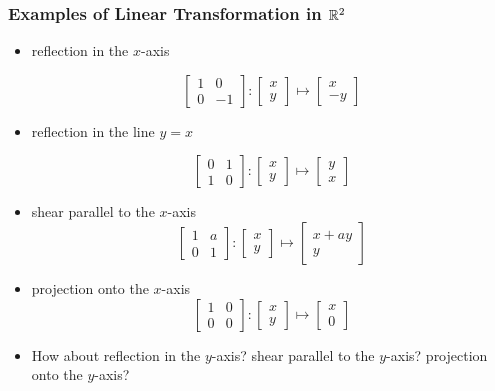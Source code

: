 \documentclass{beamer}
\begin{document}
\begin{frame}[fragile]
  \frametitle{Examples of Linear Transformation in $\mathbb{R}^2$}


\begin{itemize}
\item reflection in the $x$-axis

\[
\left[
\begin{array}{cc}
1 & 0 \\
0 & -1  
\end{array}
\right]:
\left[
\begin{array}{c}
x \\ y 
\end{array}
\right]
\mapsto
\left[
\begin{array}{c}
x \\ -y 
\end{array}
\right]
\]

\item reflection in the line $y = x$

\[
\left[
\begin{array}{cc}
0 & 1 \\
1 & 0  
\end{array}
\right]:
\left[
\begin{array}{c}
x \\ y 
\end{array}
\right]
\mapsto
\left[
\begin{array}{c}
y \\ x 
\end{array}
\right]
\]

\item shear parallel to the $x$-axis
\[
\left[
\begin{array}{cc}
1 & a \\
0 & 1  
\end{array}
\right]:
\left[
\begin{array}{c}
x \\ y 
\end{array}
\right]
\mapsto
\left[
\begin{array}{c}
x+ay \\ y 
\end{array}
\right]
\]

\item projection onto the $x$-axis
\[
\left[
\begin{array}{cc}
1 & 0 \\
0 & 0  
\end{array}
\right]:
\left[
\begin{array}{c}
x \\ y 
\end{array}
\right]
\mapsto
\left[
\begin{array}{c}
x \\ 0 
\end{array}
\right]
\]


\item How about reflection in the $y$-axis? shear parallel to the $y$-axis? projection onto the $y$-axis?

\end{itemize}

\end{frame}
\end{document}
